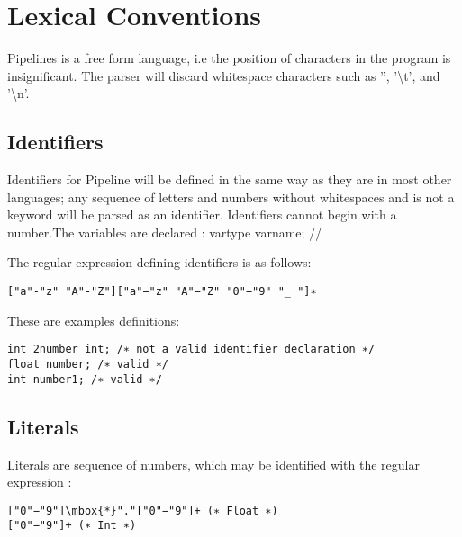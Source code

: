 \documentclass[./LRM_main.tex]{subfiles}
\begin{document}


\chapter{Lexical Conventions}

Pipelines is a free form language, i.e the position of characters in the program is insignificant. The parser will discard whitespace characters such as '', '\textbackslash t', and '\textbackslash n'. \\

\section{Identifiers}
Identifiers for Pipeline will be defined in the same way as they are in most other languages; any sequence of letters and numbers without whitespaces and is not a keyword will be parsed as an identifier. Identifiers cannot begin with a number.The variables are declared : vartype varname; //

The regular expression defining identifiers is as follows:  

\begin{lstlisting}
["a"-"z" "A"-"Z"]["a"−"z" "A"−"Z" "0"−"9" "_ "]∗
\end{lstlisting}

These are examples definitions:

\begin{lstlisting}
int 2number int; /∗ not a valid identifier declaration ∗/ 
float number; /∗ valid ∗/ 
int number1; /∗ valid ∗/
\end{lstlisting}

\section{Literals}
Literals are sequence of numbers, which may be identified with the regular expression : 
\begin{lstlisting}
["0"−"9"]\mbox{*}"."["0"−"9"]+ (∗ Float ∗)
["0"−"9"]+ (∗ Int ∗) 
\end{lstlisting}
\end{document}
